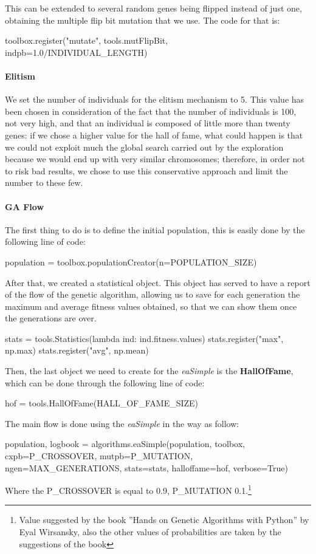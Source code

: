 This can be extended to several random genes being flipped instead of just one, obtaining the multiple flip bit mutation that we use.
The code for that is:
\begin{python}
toolbox.register("mutate", tools.mutFlipBit, indpb=1.0/INDIVIDUAL_LENGTH)
\end{python}


\paragraph{Elitism}
We set the number of individuals for the elitism mechanism to 5. This value has been chosen in consideration of the fact that the number of individuals is 100, not very high, and that an individual is composed of little more than twenty genes: if we chose a higher value for the hall of fame, what could happen is that we could not exploit much the global search carried out by the exploration because we would end up with very similar chromosomes; therefore, in order not to risk bad results, we chose to use this conservative approach and limit the number to these few.

\paragraph{GA Flow}
The first thing to do is to define the initial population, this is easily done by the following line of code:

\begin{python}
population  = toolbox.populationCreator(n=POPULATION_SIZE)
\end{python}

After that, we created a statistical object. This object has served to have a report of the flow of the genetic algorithm, allowing us to save for each generation the maximum and average fitness values obtained, so that we can show them once the generations are over.

\begin{python}
stats = tools.Statistics(lambda ind: ind.fitness.values)
stats.register("max", np.max)
stats.register("avg", np.mean)
\end{python}

Then, the last object we need to create for the \textit{eaSimple} is the \textbf{HallOfFame}, which can be done through the following line of code:

\begin{python}
hof = tools.HallOfFame(HALL_OF_FAME_SIZE)
\end{python}

The main flow is done using the \textit{eaSimple} in the way as follow:

\begin{python}
population, logbook = algorithms.eaSimple(population,
								  toolbox,
								  cxpb=P_CROSSOVER,
								  mutpb=P_MUTATION,
								  ngen=MAX_GENERATIONS,
								  stats=stats,
								  halloffame=hof,
								  verbose=True)
\end{python}

Where the P\_CROSSOVER is equal to 0.9, P\_MUTATION 0.1.\footnote{Value suggested by the book ”Hands on Genetic Algorithms with Python” by Eyal Wirsansky, also the other values of probabilities are taken by the suggestions of the book}
